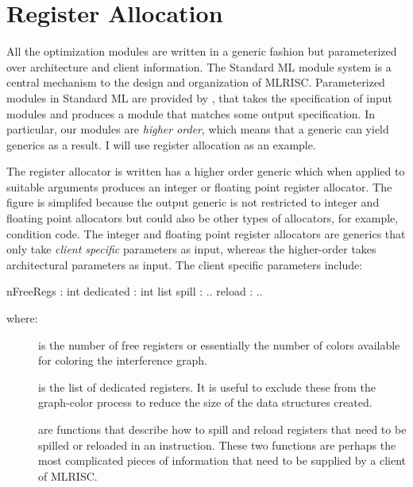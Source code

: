  \section{Register Allocation}
  All the optimization modules are written in a generic fashion but
  parameterized over architecture and client information. The Standard
  ML module system is a central mechanism to the design and
  organization of MLRISC. Parameterized modules in Standard ML are
provided by , that takes the
specification of input modules and produces a module that matches some
output specification. In particular, our modules are 
\emph{higher order}, which means that a generic can yield generics as a
result. I will use register allocation as an example.


  The register allocator is written has a higher order generic which
  when applied to suitable arguments produces an integer or floating
  point register allocator. The figure is simplifed because the output
  generic is not restricted to integer and floating point allocators
  but could also be other types of allocators, for example, condition
  code.  The integer and floating point register allocators are
  generics that only take \emph{client specific} parameters as
  input, whereas the higher-order takes architectural parameters as
  input. The client specific parameters include:
\begin{SML}
  nFreeRegs : int
  dedicated : int list
  spill : ..
  reload : ..
\end{SML}

where:
 \begin{description} 
    \item[] is the number of free registers or
    essentially the number of colors available for coloring the
    interference graph.

    \item[] is the list of dedicated registers. It
    is useful to exclude these from the graph-color process to reduce
    the size of the data structures created.

    \item[] are functions that describe how to
    spill and reload registers that need to be spilled or reloaded in
    an instruction. These two functions are perhaps the most
    complicated pieces of information that need to be supplied by a
    client of MLRISC.
\end{description} 

